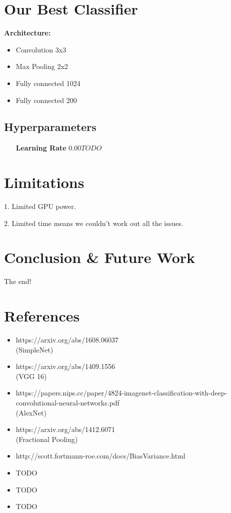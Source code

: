 \documentclass[10pt]{article} %
\begin{document}
\section{Our Best Classifier}

\begin{tcolorbox}
	\textbf{Architecture:}
	\begin{itemize}
		\setlength\itemsep{-0.3em}
		\item Convolution 3x3
		\item Max Pooling 2x2
		\item Fully connected 1024
		\item Fully connected 200
	\end{itemize}
\end{tcolorbox}

\subsection{Hyperparameters}

\begin{itemize}
	\item[\textbf{Learning Rate}] $0.00TODO$
\end{itemize}

\section{Limitations}

1. Limited GPU power.

2. Limited time means we couldn't work out all the issues.

\section{Conclusion \& Future Work}

The end!

\section{References}
\begin{itemize}
	\item https://arxiv.org/abs/1608.06037 \\ (SimpleNet)
	\item https://arxiv.org/abs/1409.1556 \\ (VGG 16)
	\item https://papers.nips.cc/paper/4824-imagenet-classification-with-deep-convolutional-neural-networks.pdf \\ (AlexNet)
	\item https://arxiv.org/abs/1412.6071 \\ (Fractional Pooling)
	\item http://scott.fortmann-roe.com/docs/BiasVariance.html
	\item TODO
	\item TODO
	\item TODO
\end{itemize}
\end{document}
